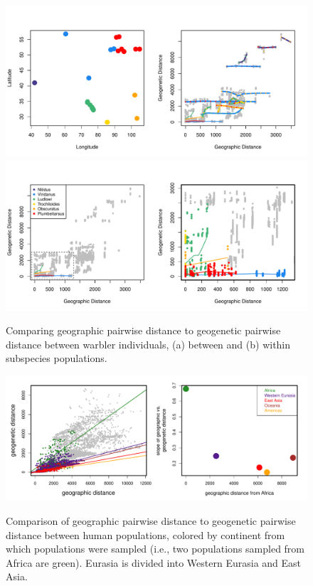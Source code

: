 \documentclass[10pt,letterpaper]{article}
\begin{document}
\clearpage

\begin{figure}
	\centering
			{\includegraphics[width=\textwidth]{../figs/warblers/warb_ind_dist_compare_allpairs.pdf}}
			{\includegraphics[width=\textwidth]{../figs/warblers/warb_ind_dist_compare.pdf}}
	\caption{Comparing geographic pairwise distance to geogenetic pairwise distance between warbler individuals, (a) between and (b) within subspecies populations.}\label{sfig:warb_ind_distcomp}
\end{figure}

\clearpage

\begin{figure}
	\centering
		{\includegraphics[width=\textwidth]{../figs/globetrotter/globe_NoAd_dist_decay.pdf}}
	\caption{Comparison of geographic pairwise distance to geogenetic pairwise distance between human populations, colored by continent from which populations were sampled (i.e., two populations sampled from Africa are green).  Eurasia is divided into Western Eurasia and East Asia.}
\label{sfig:globe_noad_distcomp}
\end{figure}
\end{document}

